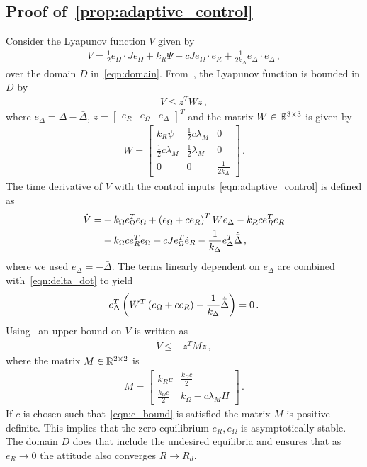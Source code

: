 \documentclass[letterpaper, 10 pt, conference]{ieeeconf}  %
\begin{document}
\subsection{Proof of~\cref{prop:adaptive_control}}\label{proof:adaptive_control}
	Consider the Lyapunov function \( V \) given by
	\begin{gather}
		V = \frac{1}{2} e_\Omega \cdot J e_\Omega + k_R \Psi + c J e_\Omega \cdot e_R + \frac{1}{2 k_\Delta} e_\Delta \cdot e_\Delta \, , \label{eqn:v_adapt}
	\end{gather}
	over the domain \( D \) in~\cref{eqn:domain}.
	From~, the Lyapunov function is bounded in \( D \) by
	\begin{gather}
		V \leq z^T W z \, , \label{eqn:v_upper_bound}
	\end{gather}
	where \( e_\Delta = \Delta - \bar{\Delta} \), \( z = \begin{bmatrix}e_R & e_\Omega & e_\Delta\end{bmatrix}^T \) and the matrix \(W \in \mathbb{R}^{3 \times 3}\) is given by
	\begin{gather*}
		W = \begin{bmatrix}
			k_R \psi & \frac{1}{2} c \lambda_M & 0 \\
			\frac{1}{2} c \lambda_M & \frac{1}{2} \lambda_M & 0 \\
			0 & 0 & \frac{1}{2 k_\Delta}
		\end{bmatrix} \, .
	\end{gather*}
	The time derivative of \( V\) with the control inputs~\cref{eqn:adaptive_control} is defined as
	\begin{align}
		\dot{V} =& - k_\Omega e_\Omega^T e_\Omega + \left( e_\Omega + c e_R \right)^T W e_\Delta - k_R c e_R^T e_R \nonumber\\
		&- k_\Omega c e_R^T e_\Omega + c J e_\Omega^T \dot{e}_R - \frac{1}{k_\Delta} e_\Delta^T \dot{\bar{\Delta}} \, , \label{eqn:vdot}
	\end{align}
	where we used \( \dot{e}_\Delta = - \dot{\bar{\Delta}} \).
	The terms linearly dependent on \( e_\Delta\) are combined with~\cref{eqn:delta_dot} to yield
	\begin{align*}
		 e_\Delta^T \left( W^T \left( e_\Omega + c e_R \right) - \frac{1}{k_\Delta} \dot{\bar{\Delta}} \right) = 0 \, . 
	\end{align*}
	Using~ an upper bound on \( \dot{V} \) is written as
	\begin{gather*}
		\dot{V} \leq -z^T M z \, ,
	\end{gather*}
	where the matrix \( M \in \mathbb{R}^{2 \times 2} \) is 
	\begin{gather}
		M = \begin{bmatrix}
			k_R c & \frac{k_\Omega c}{2} \\
			\frac{k_\Omega c}{2} & k_\Omega - c \lambda_M H
		\end{bmatrix} \, .
	\end{gather}
	If \( c \) is chosen such that~\cref{eqn:c_bound} is satisfied the matrix \( M \) is positive definite.
	This implies that the zero equilibrium \( e_R, e_\Omega\) is asymptotically stable. 
	The domain \( D \) does that include the undesired equilibria and ensures that as \( e_R \to 0 \) the attitude also converges \( R \to R_d \).
\end{document}
